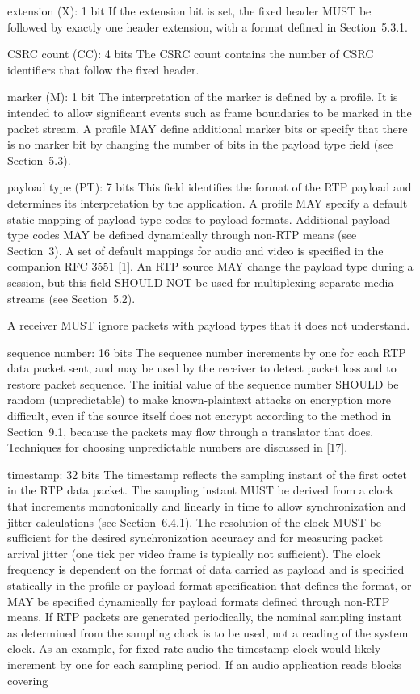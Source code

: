 \documentclass{article}
\begin{document}
extension (X): 1 bit If the extension bit is set, the fixed header MUST be followed by exactly one header extension, with a format defined in Section~5.3.1.

CSRC count (CC): 4 bits The CSRC count contains the number of CSRC identifiers that follow the fixed header.

marker (M): 1 bit The interpretation of the marker is defined by a profile.  It is intended to allow significant events such as frame boundaries to be marked in the packet stream.  A profile MAY define additional marker bits or specify that there is no marker bit by changing the number of bits in the payload type field (see Section~5.3).

payload type (PT): 7 bits This field identifies the format of the RTP payload and determines its interpretation by the application.  A profile MAY specify a default static mapping of payload type codes to payload formats. Additional payload type codes MAY be defined dynamically through non-RTP means (see Section~3).  A set of default mappings for audio and video is specified in the companion RFC 3551 [1].  An RTP source MAY change the payload type during a session, but this field SHOULD NOT be used for multiplexing separate media streams (see Section~5.2).

A receiver MUST ignore packets with payload types that it does not understand.

sequence number: 16 bits The sequence number increments by one for each RTP data packet sent, and may be used by the receiver to detect packet loss and to restore packet sequence.  The initial value of the sequence number SHOULD be random (unpredictable) to make known-plaintext attacks on encryption more difficult, even if the source itself does not encrypt according to the method in Section~9.1, because the packets may flow through a translator that does.  Techniques for choosing unpredictable numbers are discussed in [17].

timestamp: 32 bits The timestamp reflects the sampling instant of the first octet in the RTP data packet.  The sampling instant MUST be derived from a clock that increments monotonically and linearly in time to allow synchronization and jitter calculations (see Section~6.4.1).  The resolution of the clock MUST be sufficient for the desired synchronization accuracy and for measuring packet arrival jitter (one tick per video frame is typically not sufficient).  The clock frequency is dependent on the format of data carried as payload and is specified statically in the profile or payload format specification that defines the format, or MAY be specified dynamically for payload formats defined through non-RTP means.  If RTP packets are generated periodically, the nominal sampling instant as determined from the sampling clock is to be used, not a reading of the system clock.  As an example, for fixed-rate audio the timestamp clock would likely increment by one for each sampling period.  If an audio application reads blocks covering
\end{document}
